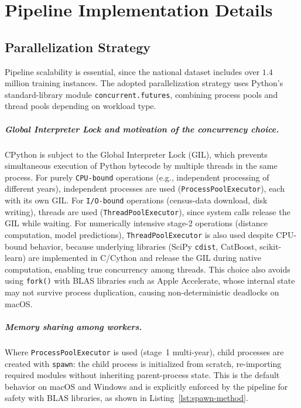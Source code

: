 
\chapter{Pipeline Implementation Details}
\label{app:pipeline-implementation}

\section{Parallelization Strategy}
\label{app:parallelization}

Pipeline scalability is essential, since the national dataset includes over $1.4$ million training instances.
The adopted parallelization strategy uses Python's standard-library module \texttt{concurrent.\allowbreak futures}, combining process pools and thread pools depending on workload type.

\paragraph{Global Interpreter Lock and motivation of the concurrency choice.}
CPython is subject to the Global Interpreter Lock (GIL), which prevents simultaneous execution of Python bytecode by multiple threads in the same process.
For purely \texttt{CPU-bound} operations (e.g., independent processing of different years), independent processes are used (\texttt{ProcessPoolExecutor}), each with its own GIL.
For \texttt{I/O-bound} operations (census-data download, disk writing), threads are used (\texttt{ThreadPoolExecutor}), since system calls release the GIL while waiting.
For numerically intensive stage-2 operations (distance computation, model predictions), \texttt{ThreadPoolExecutor} is also used despite CPU-bound behavior, because underlying libraries (SciPy \texttt{cdist}, CatBoost, scikit-learn) are implemented in C/Cython and release the GIL during native computation, enabling true concurrency among threads.
This choice also avoids using \texttt{fork()} with BLAS libraries such as Apple Accelerate, whose internal state may not survive process duplication, causing non-deterministic deadlocks on macOS.

\paragraph{Memory sharing among workers.}
Where \texttt{ProcessPool\allowbreak Executor} is used (stage~1 multi-year), child processes are created with \texttt{spawn}: the child process is initialized from scratch, re-importing required modules without inheriting parent-process state.
This is the default behavior on macOS and Windows and is explicitly enforced by the pipeline for safety with BLAS libraries, as shown in Listing~\ref{lst:spawn-method}.

